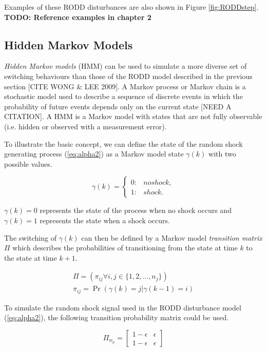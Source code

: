 Examples of these RODD disturbances are also shown in Figure \ref{fig:RODDstep}. \textbf{TODO: Reference examples in chapter 2}

\subsection{Hidden Markov Models}

\textit{Hidden Markov models} (HMM) can be used to simulate a more diverse set of switching behaviours than those of the RODD model described in the previous section [CITE WONG \& LEE 2009]. A Markov process or Markov chain is a stochastic model used to describe a sequence of discrete events in which the probability of future events depends only on the current state [NEED A CITATION]. A HMM is a Markov model with states that are not fully observable (i.e. hidden or observed with a measurement error).

To illustrate the basic concept, we can define the state of the random shock generating process (\ref{eq:alpha2}) as a Markov model state $\gamma(k)$ with two possible values.

\begin{equation} \label{eq:gamma-k}
	\gamma(k) = 
	\begin{cases*}
		0: & no shock, \\
		1: & shock.
	\end{cases*}
\end{equation}

$\gamma(k)=0$ represents the state of the process when no shock occurs and $\gamma(k)=1$ represents the state when a shock occurs.

The switching of $\gamma(k)$ can then be defined by a Markov model \textit{transition matrix} $\Pi$ which describes the probabilities of transitioning from the state at time $k$ to the state at time $k+1$.

\begin{equation} \label{eq:Pi}
	\begin{split}
	\Pi = \left(\pi_{ij} \forall i,j\in \{1,2,...,n_j\}\right) \\
	\pi_{ij}=\Pr\left(\gamma(k)=j|\gamma(k-1)=i\right)
	\end{split}
\end{equation}

To simulate the random shock signal used in the RODD disturbance model (\ref{eq:alpha2}), the following transition probability matrix could be used.

\begin{equation} \label{eq:Pi-RODD-step}
	\Pi_{w_{p}} = \begin{bmatrix}
	1-\epsilon & \epsilon \\
	1-\epsilon & \epsilon
	\end{bmatrix}
\end{equation}

